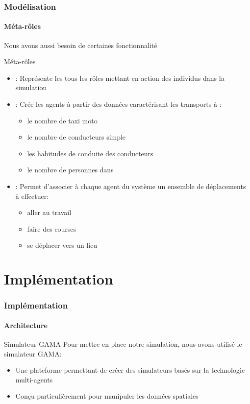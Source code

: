 \begin{frame}
    \frametitle{Modélisation}
    \framesubtitle{Méta-rôles}

    Nous avons aussi besoin de certaines fonctionnalité
    \begin{block}{Méta-rôles}
        \begin{itemize}
            \item \rIndReel{}: Représente les tous les rôles mettant en action des individus dans la simulation
            \item \rGenerateurPop{}: Crée les agents à partir des données caractérisant les transports à \ctn{}:
            \begin{itemize}
                \item le nombre de taxi moto
                \item le nombre de conducteurs simple
                \item les habitudes de conduite des conducteurs
                \item le nombre de personnes dans
            \end{itemize}
            \item \rAssociateurActivite{}: Permet d'associer à chaque agent du système un ensemble de déplacements à effectuer:
            \begin{itemize}
                \item aller au travail
                \item faire des courses
                \item se déplacer vers un lieu
            \end{itemize}
        \end{itemize}
    \end{block}
\end{frame}


\section{Implémentation}\label{implementation}
\begin{frame}
    \frametitle{Implémentation}
    \framesubtitle{Architecture}

    \begin{block}{Simulateur GAMA}
        Pour mettre en place notre simulation, nous avons utilisé le simulateur GAMA:
        \begin{itemize}
            \item Une plateforme permettant de créer des simulateurs basés sur la technologie multi-agents
            \item Conçu particulièrement pour manipuler les données spatiales
        \end{itemize}

    \end{block}

\end{frame}



